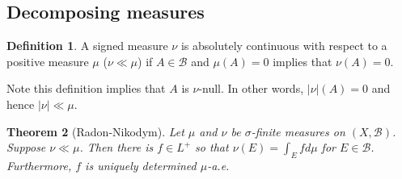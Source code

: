 \documentclass[11pt]{amsart}
\newtheorem{theorem}{Theorem}[section]
\theoremstyle{definition}
\newtheorem{definition}[theorem]{Definition}
\numberwithin{equation}{section}
\begin{document}
\subsection{Decomposing measures}
\begin{definition}
    A signed measure $\nu$ is absolutely continuous with respect to a positive measure $\mu$ ($\nu\ll\mu$) if $A\in\mathcal B$ and $\mu(A)=0$ implies that $\nu(A)=0$.

    Note this definition implies that $A$ is $\nu$-null. In other words, $|\nu|(A)=0$ and hence $|\nu|\ll\mu$.
\end{definition}
\begin{theorem}[Radon-Nikodym]\label{radon-nikodym-1}
    Let $\mu$ and $\nu$ be $\sigma$-finite measures on $(X,\mathcal B)$. Suppose $\nu\ll \mu$. Then there is $f\in L^+$ so that $\nu(E)=\int_Efd\mu$ for $E\in\mathcal B$. Furthermore, $f$ is uniquely determined $\mu$-a.e.
\end{theorem}
\end{document}

